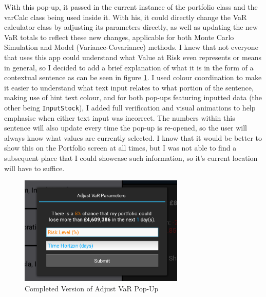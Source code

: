\documentclass{article}
\begin{document}
\vspace{0.3cm}
With this pop-up, it passed in the current instance of the portfolio class and the varCalc class being used inside it. With his, it could directly change the VaR calculator class by adjusting its parameters directly, as well as updating the new VaR totals to reflect these new changes, applicable for both Monte Carlo Simulation and Model (Variance-Covariance) methods. I knew that not everyone that uses this app could understand what Value at Risk even represents or means in general, so I decided to add a brief explanation of what it is in the form of a contextual sentence as can be seen in figure \ref{fig:Final Adjust VaR}. I used colour coordination to make it easier to understand what text input relates to what portion of the sentence, making use of hint text colour, and for both pop-ups featuring inputted data (the other being \texttt{InputStock}), I added full verification and visual animations to help emphasise when either text input was incorrect. The numbers within this sentence will also update every time the pop-up is re-opened, so the user will always know what values are currently selected. I know that it would be better to show this on the Portfolio screen at all times, but I was not able to find a subsequent place that I could showcase such information, so it's current location will have to suffice.\\\vspace{0.3cm}

\begin{figure}[h]
  \centering
  \includegraphics[width=0.7\textwidth]{Images/Term 2 Images/Final Adjust VaR.png}
  \caption{Completed Version of Adjust VaR Pop-Up}
  \label{fig:Final Adjust VaR}
\end{figure}
\end{document}
